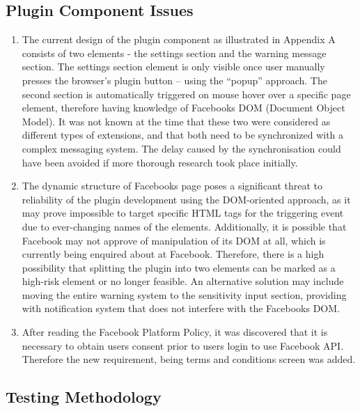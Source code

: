 \documentclass[a4paper,11pt]{article}
\begin{document}
\subsection {Plugin Component Issues}
\begin{enumerate}
\item The current design of the plugin component as illustrated in Appendix A consists of two elements - the settings section and the warning message section\cite{AppType}. The settings section element is only visible once user manually presses the browser’s plugin button – using the “popup” approach. The second section is automatically triggered on mouse hover over a specific page element, therefore having knowledge of Facebook\textquotesingle s DOM (Document Object Model). It was not known at the time that these two were considered as different types of extensions, and that both need to be synchronized with a complex messaging system\cite{MessagePassing}. The delay caused by the synchronisation could have been avoided if more thorough research took place initially. 

\item The dynamic structure of Facebook\textquotesingle s page poses a significant threat to reliability of the plugin development using the DOM-oriented approach, as it may prove impossible to target specific HTML tags for the triggering event due to ever-changing names of the elements. Additionally, it is possible that Facebook may not approve of manipulation of its DOM at all, which is currently being enquired about at Facebook. Therefore, there is a high possibility that splitting the plugin into two elements can be marked as a high-risk element or no longer feasible. An alternative solution may include moving the entire warning system to the sensitivity input section, providing with notification system that does not interfere with the Facebook\textquotesingle s DOM.

\item After reading the Facebook Platform Policy\cite{FBpolicy}, it was discovered that it is necessary to obtain user\textquotesingle s consent prior to user\textquotesingle s login to use Facebook API. Therefore the new requirement, being terms and conditions screen was added.
\end{enumerate}



\subsection {Testing Methodology}
\end{document}
